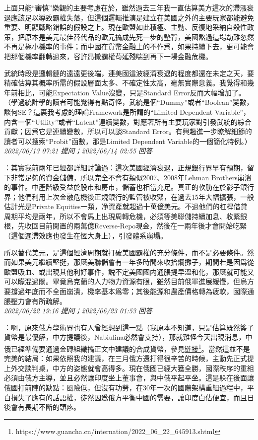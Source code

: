 \documentclass[twocolumn]{ctexart}
\begin{document}
上面只能“審慎”樂觀的主要考慮在於，雖然過去三年我一直估算美方這次的滯漲衰退應該足以導致霸權失落，但這個邏輯推演是建立在美國之外的主要玩家都能避免重要、明顯戰略錯誤的假設之上。現在歐盟如此積極、主動、反復地采納自殺性政策，把原本是美元最佳替代品的歐元搞成先死一步的墊背，美國熬過這場劫難忽然不再是極小機率的事件；而中國在貨幣金融上的不作爲，如果持續下去，更可能會把那個機率翻轉過來，容許昂撒霸權苟延殘喘到再下一場金融危機。

武統時段是邏輯鏈的遠遠更後端，連美國這波經濟衰退的程度都還在未定之天，要精確估算其概率所需的假設層面太多、不確定性太高，毫無實際意義。我覺得和幾年前相比，可能Expectation Value沒變，只是Standard Error反而大幅增加了。（學過統計學的讀者可能覺得有點奇怪，武統是個“Dummy”或者“Boolean”變數，談何SE？這裏我考慮的理論Framework是所謂的“Limited Dependent Variable”，内含一個“Utility”或者“Latent”連續變數，對應著所有主要玩家對引發武統的綜合貢獻；因爲它是連續變數，所以可以談Standard Error。有興趣進一步瞭解細節的讀者可以搜索“Probit”函數，那是Limited Dependent Variable的一個簡化特例。）
\\

\textit{\hfill\noindent\small 2022/06/13 07:21 提问；2022/06/14 02:55 回答}

：其實我前兩年已經都詳細討論過：這次美國經濟衰退，正規銀行界早有預期，留下非常足夠的資金儲備，所以完全不會有類似2007、2008年Lehman Brothers崩潰的事件。中產階級受益於股市和房市，儲蓄也相當充足。真正的軟肋在於影子銀行界；他們利用上次金融危機後正規銀行的監管被收緊，在過去15年大幅擴張，一般估計光是Private Equities一類，净資產就超過十萬億美元。不過他們的杠桿借貸周期平均是兩年，所以不會馬上出現周轉危機，必須等美聯儲持續加息、收緊銀根，先收回目前閑置的兩萬億Reverse-Repo現金，然後在一兩年後才會開始吃緊（這個遲滯效應也發生在恆大身上），引發體系崩塌。

所以替代美元，是這個經濟周期就打破美國霸權的充分條件，而不是必要條件。然而如果美元繼續堅挺，那麽美聯儲會有一年多時間來收拾爛攤子，期間若是因爲從歐盟吸血、或出現其他利好事件，説不定美國國内通脹提早溫和化，那麽就可能又可以矇混過關。畢竟烏克蘭的人力物力資源有限，雖然目前俄軍進展緩慢，但烏方要撐過年底而不全面崩潰，機率基本爲零；其後能源和農產價格轉為疲軟，國際通脹壓力會有所疏解。
\\

\textit{\hfill\noindent\small 2022/06/22 19:16 提问；2022/06/23 01:53 回答}

：啊，原來俄方學術界也有人曾經想到這一點（我原本不知道，只是估算既然籃子貨幣是最優解，中方提議後，Nabiulina必然會支持），那就難怪今天出現消息，中俄已經準備要通過金磚組織搞正文中建議的合成貨幣，參見\href{https://www.guancha.cn/internation/2022\_06\_22\_645913.shtml}{链接\footnote{\url{https://www.guancha.cn/internation/2022\_06\_22\_645913.shtml}}}。當然這並不是完美的結局：如果依照我的建議，在三月俄方還打得很辛苦的時候，主動先正式提上外交談判桌，中方的姿態就會高得多。現在俄國已經大獲全勝，國際秩序的重組必須由俄方主導，並且必然讓印度坐上董事會，與中俄平起平坐。這是躲在後面讓俄國打前陣的缺點：風險低，但沒有功勞，在30年一次的國際架構重組過程中，平白損失了應有的話語權，徒然因爲俄方平衡中國的需要，讓印度白佔便宜，而且日後會有長期不斷的頭疼。
\end{document}
